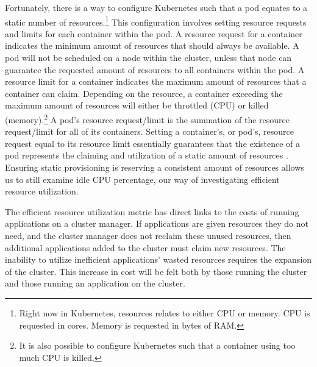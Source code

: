 Fortunately, there is a way to configure Kubernetes such that a pod
equates to a static number of resources.\footnote{Right now in Kubernetes,
resources relates to either CPU or memory. CPU is requested in cores. Memory is
requested in bytes of RAM.} This configuration involves
setting resource requests and limits for each container within the pod. A
resource request for a container indicates the minimum amount of resources that
should always be available. A pod will not be scheduled on a node within the
cluster, unless that node can guarantee the requested amount of resources to all
containers within the pod. A resource limit for a container indicates the
maximum amount of resources that a container can claim. Depending on the
resource, a container exceeding the maximum amount of resources will either be
throttled (CPU) or killed (memory).\footnote{It is also possible to configure
Kubernetes such that a container using too much CPU is killed.} A pod's resource
request/limit is the summation of the resource request/limit for all of its
containers. Setting a container's, or pod's, resource request equal to its
resource limit essentially guarantees that the existence of a pod represents the
claiming and utilization of a static amount of resources
\cite{k8s-compute-resources}. Ensuring static provisioning
is reserving a consistent amount of resources
allows us to still examine idle CPU percentage, our way of investigating
efficient resource utilization.

The efficient resource utilization metric has direct links to the costs of
running applications on a cluster manager. If applications are given resources
they do not need, and the cluster manager does not reclaim these unused
resources, then additional applications added to the cluster must claim new
resources. The inability to utilize inefficient applications' wasted resources
requires the expansion of the cluster. This increase in cost will be felt
both by those running the cluster and those running an application on the
cluster.
